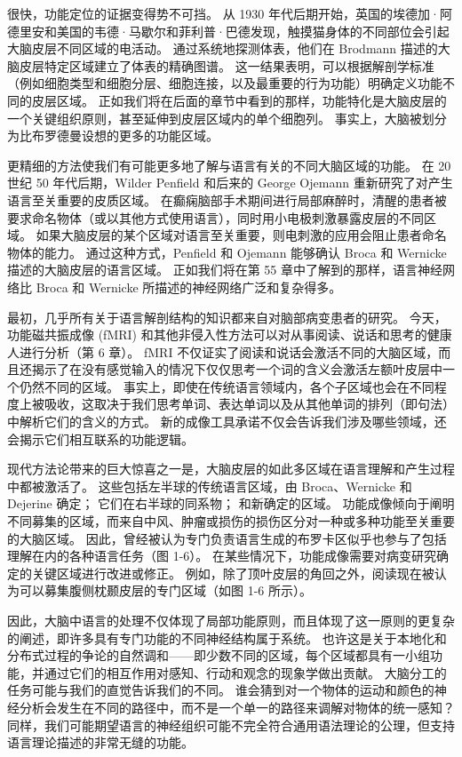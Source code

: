 很快，功能定位的证据变得势不可挡。 
从 1930 年代后期开始，英国的埃德加·阿德里安和美国的韦德·马歇尔和菲利普·巴德发现，触摸猫身体的不同部位会引起大脑皮层不同区域的电活动。 
通过系统地探测体表，他们在 Brodmann 描述的大脑皮层特定区域建立了体表的精确图谱。 
这一结果表明，可以根据解剖学标准（例如细胞类型和细胞分层、细胞连接，以及最重要的行为功能）明确定义功能不同的皮层区域。 
正如我们将在后面的章节中看到的那样，功能特化是大脑皮层的一个关键组织原则，甚至延伸到皮层区域内的单个细胞列。 
事实上，大脑被划分为比布罗德曼设想的更多的功能区域。


更精细的方法使我们有可能更多地了解与语言有关的不同大脑区域的功能。 
在 20 世纪 50 年代后期，Wilder Penfield 和后来的 George Ojemann 重新研究了对产生语言至关重要的皮质区域。 在癫痫脑部手术期间进行局部麻醉时，清醒的患者被要求命名物体（或以其他方式使用语言），同时用小电极刺激暴露皮层的不同区域。 
如果大脑皮层的某个区域对语言至关重要，则电刺激的应用会阻止患者命名物体的能力。 
通过这种方式，Penfield 和 Ojemann 能够确认 Broca 和 Wernicke 描述的大脑皮层的语言区域。 正如我们将在第 55 章中了解到的那样，语言神经网络比 Broca 和 Wernicke 所描述的神经网络广泛和复杂得多。


最初，几乎所有关于语言解剖结构的知识都来自对脑部病变患者的研究。 
今天，功能磁共振成像 (fMRI) 和其他非侵入性方法可以对从事阅读、说话和思考的健康人进行分析（第 6 章）。 
fMRI 不仅证实了阅读和说话会激活不同的大脑区域，而且还揭示了在没有感觉输入的情况下仅仅思考一个词的含义会激活左额叶皮层中一个仍然不同的区域。 
事实上，即使在传统语言领域内，各个子区域也会在不同程度上被吸收，这取决于我们思考单词、表达单词以及从其他单词的排列（即句法）中解析它们的含义的方式。 
新的成像工具承诺不仅会告诉我们涉及哪些领域，还会揭示它们相互联系的功能逻辑。


现代方法论带来的巨大惊喜之一是，大脑皮层的如此多区域在语言理解和产生过程中都被激活了。 
这些包括左半球的传统语言区域，由 Broca、Wernicke 和 Dejerine 确定； 它们在右半球的同系物； 和新确定的区域。 
功能成像倾向于阐明不同募集的区域，而来自中风、肿瘤或损伤的损伤区分对一种或多种功能至关重要的大脑区域。 
因此，曾经被认为专门负责语言生成的布罗卡区似乎也参与了包括理解在内的各种语言任务（图 1-6）。 
在某些情况下，功能成像需要对病变研究确定的关键区域进行改进或修正。 
例如，除了顶叶皮层的角回之外，阅读现在被认为可以募集腹侧枕颞皮层的专门区域（如图 1-6 所示）。


因此，大脑中语言的处理不仅体现了局部功能原则，而且体现了这一原则的更复杂的阐述，即许多具有专门功能的不同神经结构属于系统。 
也许这是关于本地化和分布式过程的争论的自然调和——即少数不同的区域，每个区域都具有一小组功能，并通过它们的相互作用对感知、行动和观念的现象学做出贡献。 
大脑分工的任务可能与我们的直觉告诉我们的不同。 谁会猜到对一个物体的运动和颜色的神经分析会发生在不同的路径中，而不是一个单一的路径来调解对物体的统一感知？ 
同样，我们可能期望语言的神经组织可能不完全符合通用语法理论的公理，但支持语言理论描述的非常无缝的功能。


